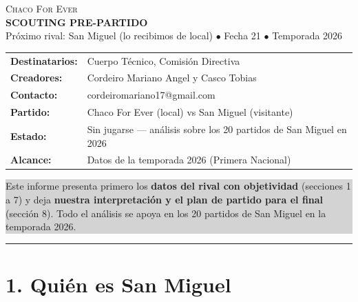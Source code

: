 \documentclass[11pt, a4paper]{article}
\begin{document}
\begin{center}
  \colorbox{primary}{%
    \parbox{\dimexpr\textwidth-2\fboxsep\relax}{%
      \vspace{4mm}\centering\color{white}
      \textsc{\Large Chaco For Ever} \\ \vspace{1mm}
      \textbf{\Large SCOUTING PRE-PARTIDO} \\ \vspace{1mm}
      \small Próximo rival: San Miguel (lo recibimos de local) $\bullet$ Fecha 21 $\bullet$ Temporada 2026
      \vspace{4mm}}}
\end{center}
\vspace{3mm}

\begin{tabular}{ll}
  \textbf{Destinatarios:} & Cuerpo Técnico, Comisión Directiva \\
  \textbf{Creadores:} & Cordeiro Mariano Angel y Casco Tobias \\
  \textbf{Contacto:} & cordeiromariano17@gmail.com \\
  \textbf{Partido:} & Chaco For Ever (local) vs San Miguel (visitante) \\
  \textbf{Estado:} & Sin jugarse — análisis sobre los 20 partidos de San Miguel en 2026 \\
  \textbf{Alcance:} & Datos de la temporada 2026 (Primera Nacional) \\
\end{tabular}

\vspace{3mm}
\noindent\colorbox{lightgray}{%
  \parbox{\dimexpr\textwidth-2\fboxsep\relax}{%
    \smallskip
    \small Este informe presenta primero los \textbf{datos del rival con objetividad} (secciones 1 a 7) y deja
    \textbf{nuestra interpretación y el plan de partido para el final} (sección 8). Todo el análisis se apoya en
    los 20 partidos de San Miguel en la temporada 2026.\smallskip
  }%
}
\vspace{2mm}
\hrule
\vspace{3mm}


\section*{1. Quién es San Miguel}
\end{document}
